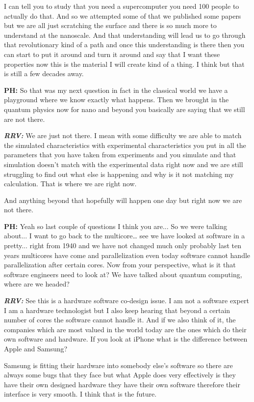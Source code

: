 \begin{multicols}{2}
I can tell you to study that you need a supercomputer you need 100 people to actually do that. And so we attempted some of that we published some papers but we are all just scratching the surface and there is so much more to understand at the nanoscale. And that understanding will lead us to go through that revolutionary kind of a path and once this understanding is there then you can start to put it around and turn it around and say that I want these properties now this is the material I will create kind of a thing. I think but that is still a few decades away.

\textbf{PH:} So that was my next question in fact in the classical world we have a playground where we know exactly what happens. Then we brought in the quantum physics now for nano and beyond you basically are saying that we still are not there.

\textbf{\textit{RRV:}} We are just not there. I mean with some difficulty we are able to match the simulated characteristics with experimental characteristics you put in all the parameters that you have taken from experiments and you simulate and that simulation doesn’t match with the experimental data right now and we are still struggling to find out what else is happening and why is it not matching my calculation. That is where we are right now. 

And anything beyond that hopefully will happen one day but right now we are not there. 

\textbf{PH:} Yeah so last couple of questions I think you are... So we were talking about... I want to go back to the multicore… see we have looked at software in a pretty... right from 1940 and we have not changed much only probably last ten years multicores have come and parallelization even today software cannot handle parallelization after certain cores. Now from your perspective, what is it that software engineers need to look at? We have talked about quantum computing, where are we headed?

\textbf{\textit{RRV:}} See this is a hardware software co-design issue. I am not a software expert I am a hardware technologist but I also keep hearing that beyond a certain number of cores the software cannot handle it. And if we also think of it, the companies which are most valued in the world today are the ones which do their own software and hardware. If you look at iPhone what is the difference between Apple and Samsung?

Samsung is fitting their hardware into somebody else’s software so there are always some bugs that they face but what Apple does very effectively is they have their own designed hardware they have their own software therefore their interface is very smooth. I think that is the future. 


\end{multicols}
